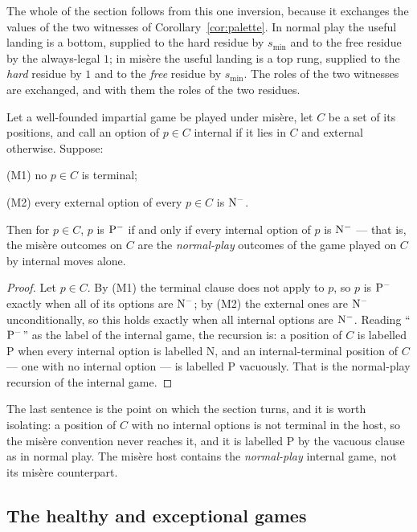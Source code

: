 The whole of the section follows from this one inversion, because it
exchanges the values of the two witnesses of
Corollary~\ref{cor:palette}. In normal play the useful landing is a
bottom, supplied to the hard residue by $s_{\min}$ and to the free
residue by the always-legal $1$; in mis\`ere the useful landing is a top
rung, supplied to the \emph{hard} residue by $1$ and to the \emph{free}
residue by $s_{\min}$. The roles of the two witnesses are exchanged, and
with them the roles of the two residues.

\begin{lemma}\label{lem:misere-transfer}
Let a well-founded impartial game be played under mis\`ere, let $C$ be a
set of its positions, and call an option of $p \in C$ internal if it lies
in $C$ and external otherwise. Suppose:

(M1) no $p \in C$ is terminal;

(M2) every external option of every $p \in C$ is $\mathrm{N}^-$.

Then for $p \in C$, $p$ is $\mathrm{P}^-$ if and only if every internal option
of $p$ is $\mathrm{N}^-$ --- that is, the mis\`ere outcomes on $C$ are the
\emph{normal-play} outcomes of the game played on $C$ by internal moves
alone.
\end{lemma}
\begin{proof}
Let $p \in C$. By (M1) the terminal clause does not apply to $p$, so $p$
is $\mathrm{P}^-$ exactly when all of its options are $\mathrm{N}^-$; by (M2) the
external ones are $\mathrm{N}^-$ unconditionally, so this holds exactly when all
internal options are $\mathrm{N}^-$. Reading ``$\mathrm{P}^-$'' as the label of the
internal game, the recursion is: a position of $C$ is labelled P when
every internal option is labelled N, and an internal-terminal position of
$C$ --- one with no internal option --- is labelled P vacuously. That is
the normal-play recursion of the internal game.
\end{proof}

The last sentence is the point on which the section turns, and it is
worth isolating: a position of $C$ with no internal options is not
terminal in the host, so the mis\`ere convention never reaches it, and it
is labelled P by the vacuous clause as in normal play. The
mis\`ere host contains the \emph{normal-play} internal game, not its
mis\`ere counterpart.

\subsection{The healthy and exceptional games}\label{sec:misere-healthy}


